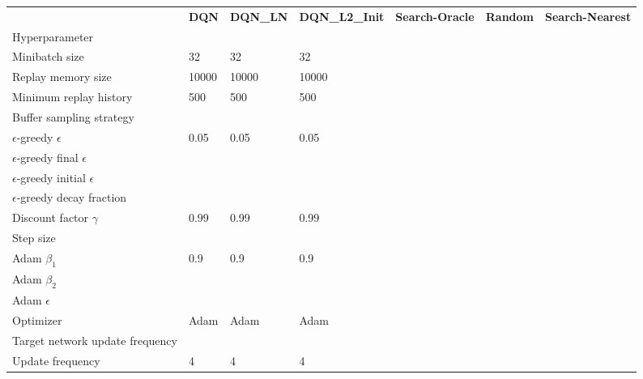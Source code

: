 \begin{tabular}{lllllll}
 & \bfseries DQN & \bfseries DQN_LN & \bfseries DQN_L2_Init & \bfseries Search-Oracle & \bfseries Random & \bfseries Search-Nearest \\
Hyperparameter &  &  &  &  &  &  \\
Minibatch size & 32 & 32 & 32 &  &  &  \\
Replay memory size & 10000 & 10000 & 10000 &  &  &  \\
Minimum replay history & 500 & 500 & 500 &  &  &  \\
Buffer sampling strategy &  &  &  &  &  &  \\
$\epsilon$-greedy $\epsilon$ & 0.05 & 0.05 & 0.05 &  &  &  \\
$\epsilon$-greedy final $\epsilon$ &  &  &  &  &  &  \\
$\epsilon$-greedy initial $\epsilon$ &  &  &  &  &  &  \\
$\epsilon$-greedy decay fraction &  &  &  &  &  &  \\
Discount factor $\gamma$ & 0.99 & 0.99 & 0.99 &  &  &  \\
Step size &  &  &  &  &  &  \\
Adam $\beta_1$ & 0.9 & 0.9 & 0.9 &  &  &  \\
Adam $\beta_2$ &  &  &  &  &  &  \\
Adam $\epsilon$ &  &  &  &  &  &  \\
Optimizer & Adam & Adam & Adam &  &  &  \\
Target network update frequency &  &  &  &  &  &  \\
Update frequency & 4 & 4 & 4 &  &  &  \\
\end{tabular}
